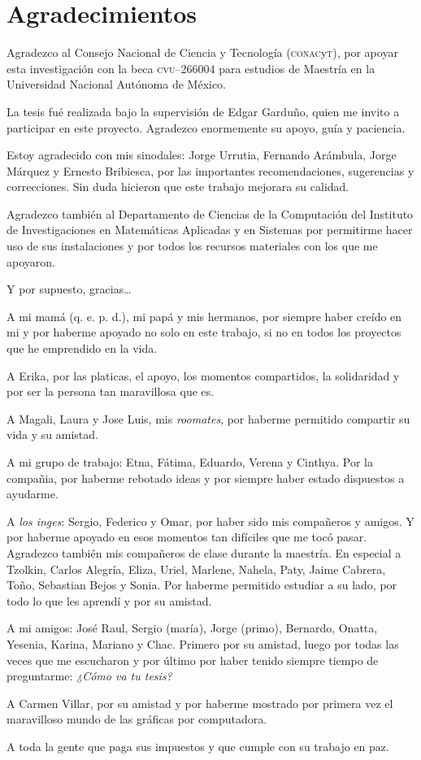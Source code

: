 \chapter*{Agradecimientos}

{\small
Agradezco al Consejo Nacional de Ciencia y Tecnología (\textsc{conac}y\textsc{t}), por apoyar esta investigación con la beca \textsc{cvu}--266004 para estudios de Maestría en la Universidad Nacional Autónoma de México.

La tesis fué realizada bajo la supervisión de Edgar Garduño, quien me invito a participar en este proyecto. Agradezco enormemente su apoyo, guía y paciencia.

Estoy agradecido con mis sinodales: Jorge Urrutia, Fernando Arámbula, Jorge Márquez y Ernesto Bribiesca, por las importantes recomendaciones, sugerencias y correcciones. Sin duda hicieron que este trabajo mejorara su calidad. 

Agradezco también al Departamento de Ciencias de la Computación del Instituto de Investigaciones en Matemáticas Aplicadas y en Sistemas por permitirme hacer uso de sus instalaciones y por todos los recursos materiales con los que me apoyaron.

Y por supuesto, gracias\ldots

A mi mamá (q. e. p. d.), mi papá y mis hermanos, por siempre haber creído en mi y por haberme apoyado no solo en este trabajo, si no en todos los proyectos que he emprendido en la vida.

A Erika, por las platicas, el apoyo, los momentos compartidos, la solidaridad y por ser la persona tan maravillosa que es.

A Magali, Laura y Jose Luis, mis \emph{roomates}, por haberme permitido compartir su vida y su amistad.

A mi grupo de trabajo: Etna, Fátima, Eduardo, Verena y Cinthya. Por la compañia, por haberme rebotado ideas y por siempre haber estado dispuestos a ayudarme.

A \emph{los inges}: Sergio, Federico y Omar, por haber sido mis compañeros y amigos. Y por haberme apoyado en esos momentos tan difíciles que me tocó pasar. Agradezco también mis compañeros de clase durante la maestría. En especial a Tzolkin, Carlos Alegría, Eliza, Uriel, Marlene, Nahela, Paty, Jaime Cabrera, Toño, Sebastian Bejos y Sonia. Por haberme permitido estudiar a su lado, por todo lo que les aprendí y por su amistad.

A mi amigos: José Raul, Sergio (maría), Jorge (primo), Bernardo, Onatta, Yesenia, Karina, Mariano y Chac. Primero por su amistad, luego por todas las veces que me escucharon y por último por haber tenido siempre tiempo de preguntarme: \emph{¿Cómo va tu tesis?}

A Carmen Villar, por su amistad y por haberme mostrado por primera vez el maravilloso mundo de las gráficas por computadora.

A toda la gente que paga sus impuestos y que cumple con su trabajo en paz.
}